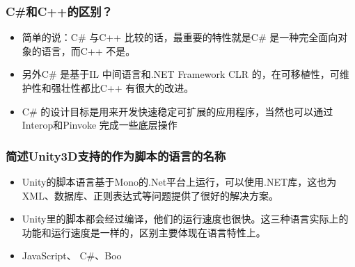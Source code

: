 \documentclass[9pt, b5paper]{article}
\begin{document}
\subsubsection{C\#和C++的区别？}
\label{sec:orgaaa3126}
\begin{itemize}
\item 简单的说：C\# 与C++ 比较的话，最重要的特性就是C\# 是一种完全面向对象的语言，而C++ 不是。
\item 另外C\# 是基于IL 中间语言和.NET Framework CLR 的，在可移植性，可维护性和强壮性都比C++ 有很大的改进。
\item C\# 的设计目标是用来开发快速稳定可扩展的应用程序，当然也可以通过Interop和Pinvoke 完成一些底层操作
\end{itemize}

\subsubsection{简述Unity3D支持的作为脚本的语言的名称}
\label{sec:orgb9f21fe}
\begin{itemize}
\item Unity的脚本语言基于Mono的.Net平台上运行，可以使用.NET库，这也为XML、数据库、正则表达式等问题提供了很好的解决方案。
\item Unity里的脚本都会经过编译，他们的运行速度也很快。这三种语言实际上的功能和运行速度是一样的，区别主要体现在语言特性上。
\item JavaScript、 C\#、Boo
\end{itemize}
\end{document}
